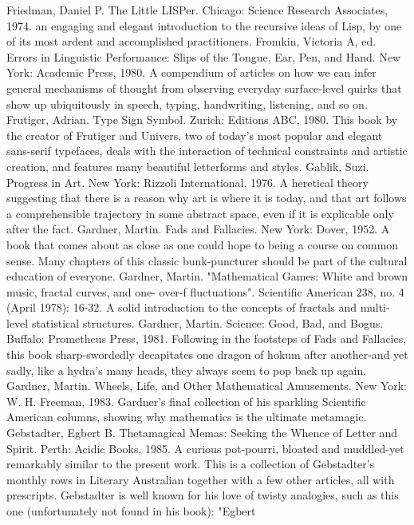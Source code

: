 Friedman, Daniel P. The Little LISPer. Chicago: Science Research Associates, 1974. an
  engaging and elegant introduction to the recursive ideas of Lisp, by one of its most ardent
  and accomplished practitioners.
Fromkin, Victoria A, ed. Errors in Linguistic Performance: Slips of the Tongue, Ear, Pen, and
  Hand. New York: Academic Press, 1980. A compendium of articles on how we can infer
  general mechanisms of thought from observing everyday surface-level quirks that show up
  ubiquitously in speech, typing, handwriting, listening, and so on.
Frutiger, Adrian. Type Sign Symbol. Zurich: Editions ABC, 1980. This book by the creator of
  Frutiger and Univers, two of today's most popular and elegant sans-serif typefaces, deals
  with the interaction of technical constraints and artistic creation, and features many
  beautiful letterforms and styles.
Gablik, Suzi. Progress in Art. New York: Rizzoli International, 1976. A heretical theory
  suggesting that there is a reason why art is where it is today, and that art follows a
  comprehensible trajectory in some abstract space, even if it is explicable only after the fact.
Gardner, Martin. Fads and Fallacies. New York: Dover, 1952. A book that comes about as
  close as one could hope to being a course on common sense. Many chapters of this classic
  bunk-puncturer should be part of the cultural education of everyone.
Gardner, Martin. "Mathematical Games: White and brown music, fractal curves, and one-
  over-f fluctuations". Scientific American 238, no. 4 (April 1978): 16-32. A solid
  introduction to the concepts of fractals and multi-level statistical structures.
Gardner, Martin. Science: Good, Bad, and Bogus. Buffalo: Prometheus Press, 1981.
  Following in the footsteps of Fads and Fallacies, this book sharp-swordedly decapitates one
  dragon of hokum after another-and yet sadly, like a hydra's many heads, they always seem
  to pop back up again.
Gardner, Martin. Wheels, Life, and Other Mathematical Amusements. New York: W. H.
  Freeman, 1983. Gardner's final collection of his sparkling Scientific American columns,
  showing why mathematics is the ultimate metamagic.
Gebstadter, Egbert B. Thetamagical Memas: Seeking the Whence of Letter and Spirit. Perth:
  Acidic Books, 1985. A curious pot-pourri, bloated and muddled-yet remarkably similar to
  the present work. This is a collection of Gebstadter's monthly rows in Literary Australian
  together with a few other articles, all with prescripts. Gebstadter is well known for his love
  of twisty analogies, such as this one (unfortunately not found in his book): "Egbert
